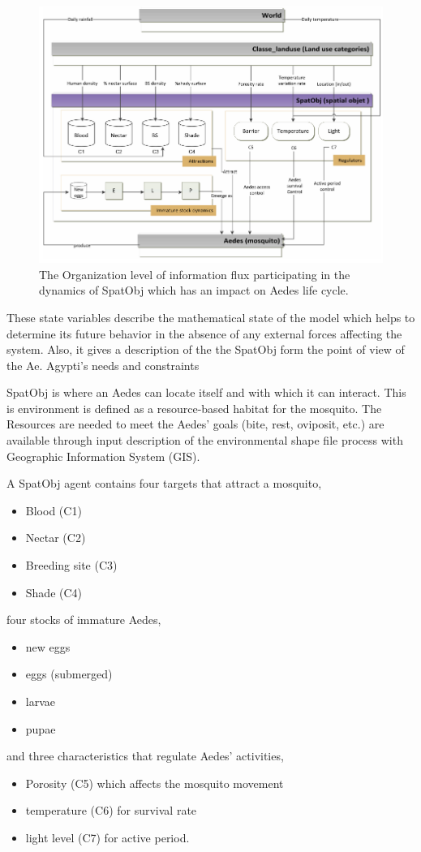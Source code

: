 \begin{figure}
  \centering \includegraphics[width = 17cm]{fig1.PNG}
  \caption{The Organization level of information flux participating in the dynamics of SpatObj which has an impact on Aedes life cycle.}
\end{figure}

These state variables describe the mathematical state of the model which helps to determine its future behavior in the absence of any external forces affecting the system. Also, it gives a description of the the SpatObj form the point of view of the Ae. Agypti's needs and constraints

SpatObj is where an Aedes can locate itself and with which it can interact. This is environment is defined as a resource-based habitat for the mosquito.\cite{Hartemink} The Resources are needed to meet the Aedes' goals (bite, rest, oviposit, etc.) are available through input description of the environmental shape file process with Geographic Information System (GIS).

A SpatObj agent contains four targets that attract a mosquito,
\begin{itemize}
    \item Blood (C1)
    \item Nectar (C2)
    \item Breeding site (C3)
    \item Shade (C4)
\end{itemize}
four stocks of immature Aedes,
\begin{itemize}
    \item new eggs
    \item eggs (submerged)
    \item larvae
    \item pupae
\end{itemize}
and three characteristics that regulate Aedes' activities,
\begin{itemize}
    \item Porosity (C5) which affects the mosquito movement
    \item temperature (C6) for survival rate
    \item light level (C7) for active period. 
\end{itemize}


